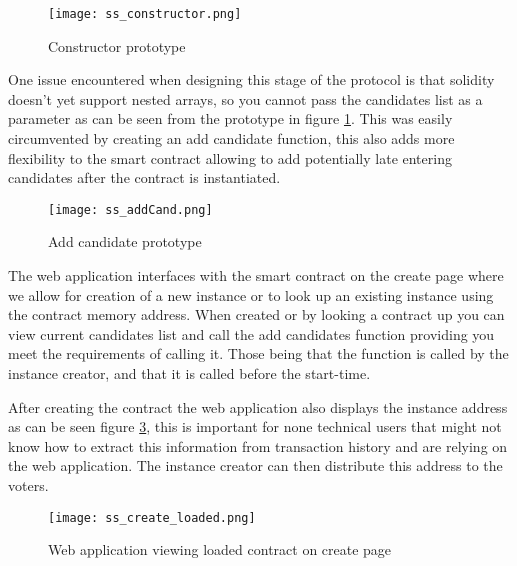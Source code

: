 \documentclass{entcs}
\begin{document}
\begin{figure}[h!]
    \centering
    \texttt{[image: ss\_constructor.png]}
    \caption{Constructor prototype}
    \label{fig:constructor}
\end{figure}


One issue encountered when designing this stage of the protocol is that solidity doesn't yet support nested arrays, so you cannot pass the candidates list as a parameter as can be seen from the prototype in figure \ref{fig:constructor}. This was easily circumvented by creating an add candidate function, this also adds more flexibility to the smart contract allowing to add potentially late entering candidates after the contract is instantiated. 

\begin{figure}[h!]
    \centering
    \texttt{[image: ss\_addCand.png]}
    \caption{Add candidate prototype}
    \label{fig:addCand}
\end{figure}

The web application interfaces with the smart contract on the create page where we allow for creation of a new instance or to look up an existing instance using the contract memory address. When created or by looking a contract up you can view current candidates list and call the add candidates function providing you meet the requirements of calling it. Those being that the function is called by the instance creator, and that it is called before the start-time.

After creating the contract the web application also displays the instance address as can be seen figure \ref{fig:create_loaded}, this is important for none technical users that might not know how to extract this information from transaction history and are relying on the web application. The instance creator can then distribute this address to the voters.

\begin{figure}[h!]
    \centering
    \texttt{[image: ss\_create\_loaded.png]}
    \caption{Web application viewing loaded contract on create page}
    \label{fig:create_loaded}
\end{figure}

\end{document}
